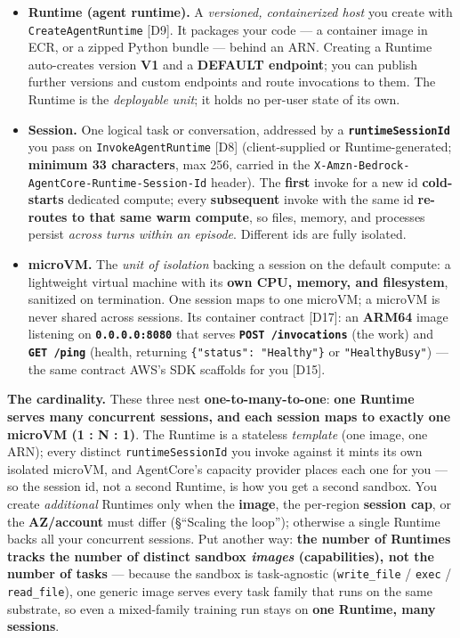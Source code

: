 \documentclass[
  paper=a4,
  ,captions=tableheading
]{scrartcl}
\providecommand{\tightlist}{%
  \setlength{\itemsep}{0pt}\setlength{\parskip}{0pt}}
\begin{document}
\begin{itemize}
\tightlist
\item
  \textbf{Runtime (agent runtime).} A \emph{versioned, containerized
  host} you create with \texttt{CreateAgentRuntime} {[}D9{]}. It
  packages your code --- a container image in ECR, or a zipped Python
  bundle --- behind an ARN. Creating a Runtime auto-creates version
  \textbf{V1} and a \textbf{DEFAULT endpoint}; you can publish further
  versions and custom endpoints and route invocations to them. The
  Runtime is the \emph{deployable unit}; it holds no per-user state of
  its own.
\item
  \textbf{Session.} One logical task or conversation, addressed by a
  \textbf{\texttt{runtimeSessionId}} you pass on
  \texttt{InvokeAgentRuntime} {[}D8{]} (client-supplied or
  Runtime-generated; \textbf{minimum 33 characters}, max 256, carried in
  the \texttt{X-Amzn-Bedrock-AgentCore-Runtime-Session-Id} header). The
  \textbf{first} invoke for a new id \textbf{cold-starts} dedicated
  compute; every \textbf{subsequent} invoke with the same id
  \textbf{re-routes to that same warm compute}, so files, memory, and
  processes persist \emph{across turns within an episode}. Different ids
  are fully isolated.
\item
  \textbf{microVM.} The \emph{unit of isolation} backing a session on
  the default compute: a lightweight virtual machine with its
  \textbf{own CPU, memory, and filesystem}, sanitized on termination.
  One session maps to one microVM; a microVM is never shared across
  sessions. Its container contract {[}D17{]}: an \textbf{ARM64} image
  listening on \textbf{\texttt{0.0.0.0:8080}} that serves
  \textbf{\texttt{POST\ /invocations}} (the work) and
  \textbf{\texttt{GET\ /ping}} (health, returning
  \texttt{\{"status":\ "Healthy"\}} or \texttt{"HealthyBusy"}) --- the
  same contract AWS's SDK scaffolds for you {[}D15{]}.
\end{itemize}

\textbf{The cardinality.} These three nest \textbf{one-to-many-to-one}:
\textbf{one Runtime serves many concurrent sessions, and each session
maps to exactly one microVM (1 : N : 1)}. The Runtime is a stateless
\emph{template} (one image, one ARN); every distinct
\texttt{runtimeSessionId} you invoke against it mints its own isolated
microVM, and AgentCore's capacity provider places each one for you ---
so the session id, not a second Runtime, is how you get a second
sandbox. You create \emph{additional} Runtimes only when the
\textbf{image}, the per-region \textbf{session cap}, or the
\textbf{AZ/account} must differ (§``Scaling the loop''); otherwise a
single Runtime backs all your concurrent sessions. Put another way:
\textbf{the number of Runtimes tracks the number of distinct sandbox
\emph{images} (capabilities), not the number of tasks} --- because the
sandbox is task-agnostic (\texttt{write\_file} / \texttt{exec} /
\texttt{read\_file}), one generic image serves every task family that
runs on the same substrate, so even a mixed-family training run stays on
\textbf{one Runtime, many sessions}.
\end{document}
